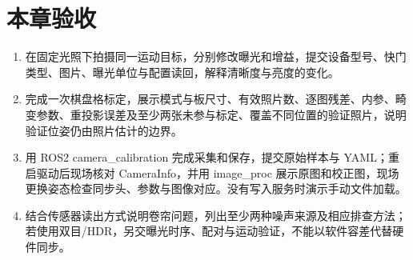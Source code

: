 \section{本章验收}
\begin{enumerate}
    \item 在固定光照下拍摄同一运动目标，分别修改曝光和增益，提交设备型号、快门类型、图片、曝光单位与配置读回，解释清晰度与亮度的变化。
    \item 完成一次棋盘格标定，展示模式与板尺寸、有效照片数、逐图残差、内参、畸变参数、重投影误差及至少两张未参与标定、覆盖不同位置的验证照片，说明验证位姿仍由照片估计的边界。
    \item 用 ROS2 camera\_calibration 完成采集和保存，提交原始样本与 YAML；重启驱动后现场核对 CameraInfo，并用 image\_proc 展示原图和校正图，现场更换姿态检查同步头、参数与图像对应。没有写入服务时演示手动文件加载。
    \item 结合传感器读出方式说明卷帘问题，列出至少两种噪声来源及相应排查方法；若使用双目/HDR，另交曝光时序、配对与运动验证，不能以软件容差代替硬件同步。
\end{enumerate}
